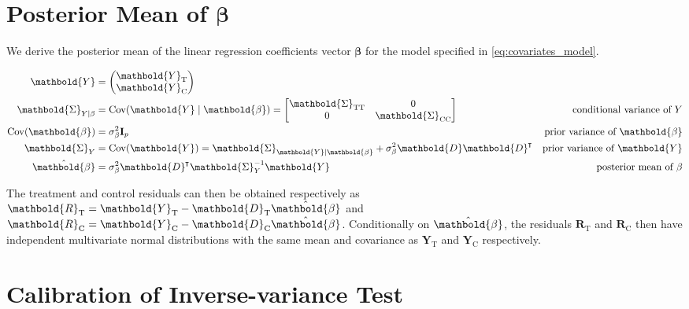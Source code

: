 \documentclass[letter,12pt]{article}
\DeclarePairedDelimiter{\parenthesis}{\lparen}{\rparen}
\newcommand{\del}[1]{\parenthesis*{#1}}
\DeclareMathOperator{\cov}{{Cov}}
\newcommand*{\trans}{^{\mkern-1.5mu\intercal}}
\newcommand{\treat}{\mathrm{T}}
\newcommand{\ctrol}{\mathrm{C}}
\newcommand{\sigmabeta}{\sigma_{\beta}}
\newcommand{\Yvec}{\mathbold{Y}}
\newcommand{\yt}{\Yvec_{\treat}}
\newcommand{\yc}{\Yvec_{\ctrol}}
\newcommand{\betavec}{\mathbold{\beta}}
\newcommand{\residvec}{\mathbold{R}}
\newcommand{\eye}{\mathbf{I}}
\newcommand{\Dmat}{\mathbold{D}}
\newcommand{\SigmaMat}{\mathbold{\Sigma}}
\newcommand{\STT}{\SigmaMat_{\treat \treat}}
\newcommand{\SCC}{\SigmaMat_{\ctrol \ctrol}}
\begin{document}
\hypertarget{posterior-mean-of-betavec}{%
\section{\texorpdfstring{Posterior Mean of \(\betavec\)}{Posterior Mean of \textbackslash{}betavec}}\label{posterior-mean-of-betavec}}

\label{sec:betahat}

We derive the posterior mean of the linear regression coefficients vector \(\betavec\) for the model specified in \eqref{eq:covariates_model}.



\begin{equation}
    \begin{aligned}
        \Yvec &= \begin{pmatrix}
            \yt \\
            \yc
        \end{pmatrix}
        \\
        \SigmaMat_{Y \mid \beta} &= \cov\del{\Yvec \mid \betavec }
        = \begin{bmatrix}
            \STT & 0 \\
            0 & \SCC
        \end{bmatrix}
        & \text{conditional variance of $Y$} \\
        \cov\del{\betavec} &= \sigmabeta^2 \eye_p
                           & \text{prior variance of $\betavec$} \\
        \SigmaMat_Y &= \cov\del{\Yvec} 
        = \SigmaMat_{\Yvec \mid \betavec} 
        + \sigmabeta^2 \Dmat \Dmat\trans
        & \text{prior variance of $\Yvec$} \\
        \hat\betavec &= \sigmabeta^2 \Dmat\trans\SigmaMat_{Y}^{-1} \Yvec
                     & \text{posterior mean of $\beta$}
    \end{aligned}
\end{equation}



The treatment and control residuals can then be obtained respectively as \(\residvec_\treat = \yt - \Dmat_\treat \hat\betavec\) and \(\residvec_\ctrol = \yc - \Dmat_\ctrol \hat\betavec\).
Conditionally on \(\hat\betavec\), the residuals \(\residvec_\treat\) and \(\residvec_\ctrol\) then have independent multivariate normal distributions with the same mean and covariance as \(\yt\) and \(\yc\) respectively.



\hypertarget{calibration-of-inverse-variance-test}{%
\section{Calibration of Inverse-variance Test}\label{calibration-of-inverse-variance-test}}
\end{document}
